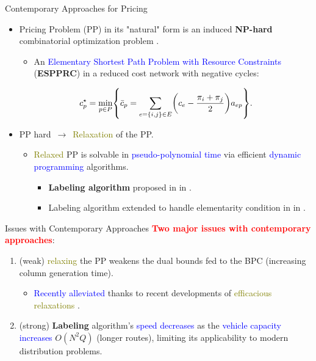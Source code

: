 \begin{frame}{Contemporary Approaches for Pricing}
	\begin{itemize}[<+->]
		\item Pricing Problem (PP) in its "natural" form is an induced \textbf{NP-hard} combinatorial optimization problem \parencite{dror1994}.
		      \begin{itemize}[<.->]
			      \item An \textcolor{blue}{Elementary Shortest Path Problem with Resource Constraints} (\textbf{ESPPRC}) in a reduced cost network with negative cycles:
		      \end{itemize}
		      \begin{equation}\label{eq:pp-problem}
			      {c^\star_p} = \min_{p \in P} \Set*{ \bar{c}_p = \sum_{e = \Set*{i, j} \in E} \Expr*{c_{e} - \frac{\pi_i + \pi_j}{2}} a_{ep}  }.
		      \end{equation}
		\item PP hard $\,\to\,$ \textcolor{olive}{Relaxation} of the PP.
		      \begin{itemize}[<.->]
			      \item \textcolor{olive}{Relaxed} PP is solvable in \textcolor{blue}{pseudo-polynomial time} \parencite{desrochers1988, irnich2005} via efficient \textcolor{blue}{dynamic programming} algorithms.
			            \begin{itemize}[<.->]
				            \item \textbf{Labeling algorithm} proposed in \citeyear{desrochers1992} in \cite{desrochers1992}.
				            \item Labeling algorithm extended to handle elementarity condition in \citeyear{feillet2004} in \cite{feillet2004}.
			            \end{itemize}
		      \end{itemize}
	\end{itemize}
\end{frame}

\begin{frame}{Issues with Contemporary Approaches}
	\textcolor{red}{\textbf{Two major issues with contemporary approaches}}:
	\begin{enumerate}
		\item (weak) \textcolor{olive}{relaxing} the PP weakens the dual bounds fed to the BPC (increasing column generation time).
		      \begin{itemize}[<.->]
			      \item \textcolor{blue}{Recently alleviated} thanks to recent developments of \textcolor{olive}{efficacious relaxations} \parencite{baldacci2011}.
		      \end{itemize}
		\item (strong) \textbf{Labeling} algorithm's \textcolor{blue}{speed decreases} as the \textcolor{blue}{vehicle capacity increases} $O(N^2 Q)$ (longer routes), limiting its applicability to modern distribution problems.
	\end{enumerate}
\end{frame}

